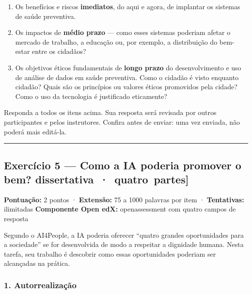 \documentclass[
  11pt,
]{article}
\providecommand{\tightlist}{%
  \setlength{\itemsep}{0pt}\setlength{\parskip}{0pt}}
\renewcommand{\texttt}[1]{{\color{iaAmeixa}\small\ttfamily #1}}
\begin{document}
\begin{enumerate}
\def\labelenumi{\arabic{enumi}.}
\tightlist
\item
  Os benefícios e riscos \textbf{imediatos}, do aqui e agora, de
  implantar os sistemas de saúde preventiva.
\item
  Os impactos de \textbf{médio prazo} --- como esses sistemas poderiam
  afetar o mercado de trabalho, a educação ou, por exemplo, a
  distribuição do bem-estar entre os cidadãos?
\item
  Os objetivos éticos fundamentais de \textbf{longo prazo} do
  desenvolvimento e uso de análise de dados em saúde preventiva. Como o
  cidadão é visto enquanto cidadão? Quais são os princípios ou valores
  éticos promovidos pela cidade? Como o uso da tecnologia é justificado
  eticamente?
\end{enumerate}

Responda a todos os itens acima. Sua resposta será revisada por outros
participantes e pelos instrutores. Confira antes de enviar: uma vez
enviada, não poderá mais editá-la.

\begin{center}\rule{0.5\linewidth}{0.5pt}\end{center}

\hypertarget{exercuxedcio-5-como-a-ia-poderia-promover-o-bem-dissertativa-quatro-partes}{%
\subsection{\texorpdfstring{Exercício 5 --- Como a IA poderia promover o
bem?
\texttt{{[}dissertativa\ ·\ quatro\ partes{]}}}{Exercício 5 --- Como a IA poderia promover o bem? {[}dissertativa · quatro partes{]}}}\label{exercuxedcio-5-como-a-ia-poderia-promover-o-bem-dissertativa-quatro-partes}}

\textbf{Pontuação:} 2 pontos · \textbf{Extensão:} 75 a 1000 palavras por
item · \textbf{Tentativas:} ilimitadas \textbf{Componente Open edX:}
\texttt{openassessment} com quatro campos de resposta

Segundo o AI4People, a IA poderia oferecer ``quatro grandes
oportunidades para a sociedade'' se for desenvolvida de modo a respeitar
a dignidade humana. Nesta tarefa, seu trabalho é descobrir como essas
oportunidades poderiam ser alcançadas na prática.

\hypertarget{autorrealizauxe7uxe3o}{%
\subsubsection{1. Autorrealização}\label{autorrealizauxe7uxe3o}}
\end{document}
